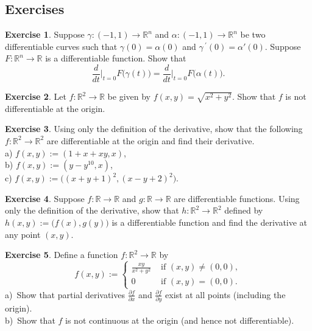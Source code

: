 \documentclass[12pt]{book}
\newcommand{\R}{{\mathbb{R}}}
\theoremstyle{plain}
\theoremstyle{remark}
\theoremstyle{definition}
\theoremstyle{exercise}
\newtheorem{exercise}{Exercise}[section]
\theoremstyle{example}
\begin{document}
\subsection{Exercises}

\begin{exercise}
Suppose $\gamma \colon (-1,1) \to \R^n$ and
$\alpha \colon (-1,1) \to \R^n$ be two differentiable curves
such that $\gamma(0) = \alpha(0)$ and $\gamma^{\:\prime}(0) = \alpha'(0)$.
Suppose $F \colon \R^n \to \R$ is a differentiable function.  Show that
\begin{equation*}
\frac{d}{dt}\Big|_{t=0}
F\bigl(\gamma(t)\bigr)
=
\frac{d}{dt}\Big|_{t=0}
F\bigl(\alpha(t)\bigr)
.
\end{equation*}
\end{exercise}

\begin{exercise}
Let $f \colon \R^2 \to \R$ be given by
$f(x,y)
=
\sqrt{x^2+y^2}$.
Show that $f$ is not differentiable at the origin.
\end{exercise}

\begin{exercise}
Using only the definition of the derivative, show that
the following $f \colon \R^2 \to \R^2$ are differentiable at the origin and
find their derivative.
\\
a) $f(x,y) := (1+x+xy,x)$,
\\
b) $f(x,y) := (y-y^{10},x)$,
\\
c) $f(x,y) := \bigl( (x+y+1)^2 , (x-y+2)^2 \bigr)$.
\end{exercise}

\begin{exercise}
Suppose $f \colon \R \to \R$ and $g \colon \R \to \R$ are differentiable
functions.  Using only the definition of the derivative, show that
$h \colon \R^2 \to \R^2$ defined by $h(x,y)
:= \bigl(f(x),g(y)\bigr)$ is a differentiable function and find the
derivative at any point $(x,y)$.
\end{exercise}

\begin{exercise} \label{exercise:noncontpartialsexist}
Define a function $f \colon \R^2 \to \R$ by
\begin{equation*}
f(x,y)
:=
\begin{cases}
\frac{xy}{x^2+y^2} & \text{ if $(x,y) \not= (0,0)$}, \\
0 & \text{ if $(x,y) = (0,0)$}.
\end{cases}
\end{equation*}
a)~Show that partial derivatives 
$\frac{\partial f}{\partial x}$ and
$\frac{\partial f}{\partial y}$ exist at all points (including the origin).\\
b)~Show that $f$ is not continuous at the origin (and hence not
differentiable).
\end{exercise}
\end{document}
